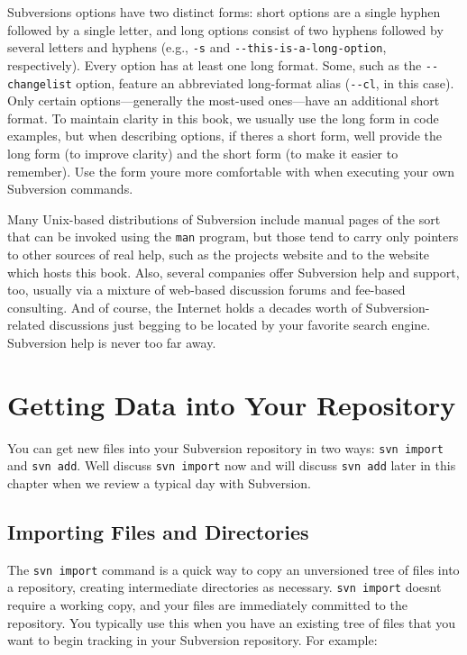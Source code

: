 Subversion\textquotesingle s options have two distinct forms: short
options are a single hyphen followed by a single letter, and long
options consist of two hyphens followed by several letters and hyphens
(e.g., \texttt{-s} and \texttt{-\/-this-is-a-long-option},
respectively). Every option has at least one long format. Some, such as
the \texttt{-\/-changelist} option, feature an abbreviated long-format
alias (\texttt{-\/-cl}, in this case). Only certain options---generally
the most-used ones---have an additional short format. To maintain
clarity in this book, we usually use the long form in code examples, but
when describing options, if there\textquotesingle s a short form,
we\textquotesingle ll provide the long form (to improve clarity) and the
short form (to make it easier to remember). Use the form
you\textquotesingle re more comfortable with when executing your own
Subversion commands.

Many Unix-based distributions of Subversion include manual pages of the
sort that can be invoked using the \texttt{man} program, but those tend
to carry only pointers to other sources of real help, such as the
project\textquotesingle s website and to the website which hosts this
book. Also, several companies offer Subversion help and support, too,
usually via a mixture of web-based discussion forums and fee-based
consulting. And of course, the Internet holds a decade\textquotesingle s
worth of Subversion-related discussions just begging to be located by
your favorite search engine. Subversion help is never too far away.

\section{Getting Data into Your Repository}\label{svn.tour.importing}

You can get new files into your Subversion repository in two ways:
\texttt{svn\ import} and \texttt{svn\ add}. We\textquotesingle ll
discuss \texttt{svn\ import} now and will discuss \texttt{svn\ add}
later in this chapter when we review a typical day with Subversion.

\subsection{Importing Files and
Directories}\label{svn.tour.importing.import}

The \texttt{svn\ import} command is a quick way to copy an unversioned
tree of files into a repository, creating intermediate directories as
necessary. \texttt{svn\ import} doesn\textquotesingle t require a
working copy, and your files are immediately committed to the
repository. You typically use this when you have an existing tree of
files that you want to begin tracking in your Subversion repository. For
example:

